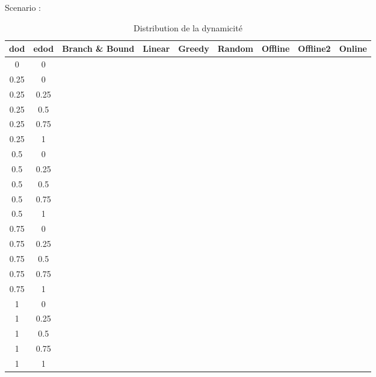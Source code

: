   \begin{table}[h]
  Scenario :
  
  \centering
  
  \begin{tabular}{|c|c|c|c|c|c|c|c|c|}
    \hline
    dod & edod & Branch \& Bound & Linear & Greedy & Random & Offline & Offline2 & Online \\
    \hline
      0 & 0 & & & & & & &\\ %
    \hline
      0.25 & 0 & & & & & & &\\
    \hline
      0.25 & 0.25 & & & & & & &\\
    \hline
      0.25 & 0.5 & & & & & & &\\
    \hline
      0.25 & 0.75 & & & & & & &\\
    \hline
      0.25 & 1 & & & & & & &\\
    \hline
      0.5 & 0 & & & & & & &\\
    \hline
      0.5 & 0.25 & & & & & & &\\
    \hline
      0.5 & 0.5 & & & & & & &\\
    \hline
      0.5 & 0.75 & & & & & & &\\
    \hline
      0.5 & 1 & & & & & & &\\
      \hline
      0.75 & 0 & & & & & & &\\
     \hline
      0.75 & 0.25 & & & & & & &\\
    \hline
      0.75 & 0.5 & & & & & & &\\
    \hline
      0.75 & 0.75 & & & & & & &\\
    \hline
      0.75 & 1 & & & & & & &\\
      \hline
      1 & 0 & & & & & & &\\
    \hline
      1 & 0.25 & & & & & & &\\
    \hline
      1 & 0.5 & & & & & & &\\
    \hline
      1 & 0.75 & & & & & & &\\
    \hline
      1 & 1 & & & & & & &\\ %
      \hline
  \end{tabular}
  \label{tab:distributionDeLaDynamicite}
  \caption{Distribution de la dynamicité}
  \normalsize
  \end{table}

